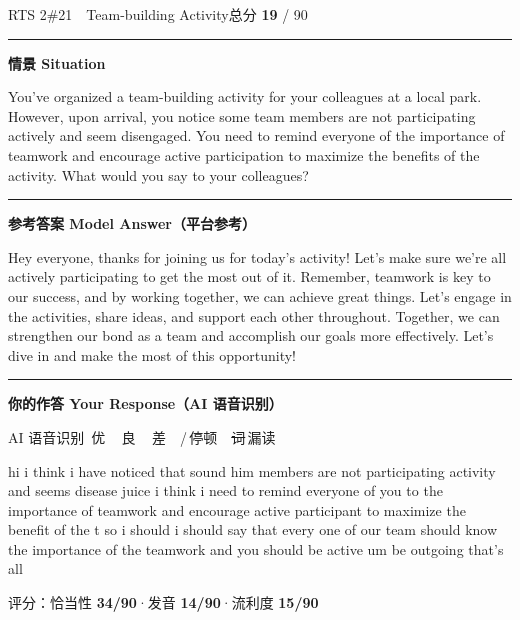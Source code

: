 \documentclass[11pt]{article}
\newcommand{\spart}[1]{\textcolor{cPartial}{\bfseries #1}} %
\newcommand{\szero}[1]{\textcolor{cWrong}{\bfseries #1}}   %
\newcommand{\ptesub}[1]{%
  \par\needspace{2\baselineskip}\smallskip
  {\color{cAccent}\rule[-0.2ex]{3pt}{1.05em}}\hspace{6pt}%
  {\bfseries\color{cHead}#1}\par\nopagebreak\smallskip}
\newcommand{\sg}[1]{\textcolor{cSpkGood}{#1}}   %
\newcommand{\sy}[1]{\textcolor{cSpkOk}{#1}}     %
\newcommand{\sr}[1]{\textcolor{cSpkBad}{#1}}    %
\newcommand{\asrlegend}{{\footnotesize\color{gray}AI 语音识别\quad
  {\color{cSpkGood}\textbullet}\,优\ \ {\color{cSpkOk}\textbullet}\,良\ \
  {\color{cSpkBad}\textbullet}\,差\ \ {\color{gray}/}\,停顿\ \
  {\color{cSpkBad}\sout{词}}\,漏读}}
\begin{document}
\begin{qblock}{RTS 2\quad \#21\ \ Team-building Activity}{总分 \textcolor{cAccent}{\bfseries 19} / 90}
\ptesub{情景 Situation}
\begin{promptbox}
You've organized a team-building activity for your colleagues at a local park. However, upon arrival, you notice some team members are not participating actively and seem disengaged. You need to remind everyone of the importance of teamwork and encourage active participation to maximize the benefits of the activity. What would you say to your colleagues?
\end{promptbox}
\ptesub{参考答案 Model Answer（平台参考）}
\begin{modelbox}
Hey everyone, thanks for joining us for today's activity! Let's make sure we're all actively participating to get the most out of it. Remember, teamwork is key to our success, and by working together, we can achieve great things. Let's engage in the activities, share ideas, and support each other throughout. Together, we can strengthen our bond as a team and accomplish our goals more effectively. Let's dive in and make the most of this opportunity!
\end{modelbox}
\ptesub{你的作答 Your Response（AI 语音识别）}
\asrlegend
\begin{asrbox}
\sg{hi} \sr{i} \sg{think i have} \sy{noticed} \sg{that sound} \sr{him} \sg{members are not} \sy{participating activity and seems} \sy{disease} \sr{juice} \sg{i think} \sr{i} \sg{need to} \sg{remind everyone} \sy{of you} \sg{to} \sy{the importance of teamwork and} \sy{encourage active participant to} \sr{maximize} \sg{the benefit of} \sy{the t} \sg{so} \sy{i should i should say that every one} \sy{of our team should} \sg{know} \sr{the} \sy{importance} \sg{of} \sy{the} \sy{teamwork and you should be active um} \sg{be outgoing that's all}
\end{asrbox}
{\small 评分：恰当性 \spart{34/90}\quad·\quad 发音 \szero{14/90}\quad·\quad 流利度 \szero{15/90}\quad{\footnotesize\color{gray}（答题用时 01:30）}}
\end{qblock}
\end{document}
